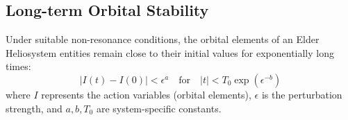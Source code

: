 \subsection{Long-term Orbital Stability}

\begin{theorem}
Under suitable non-resonance conditions, the orbital elements of an Elder Heliosystem entities remain close to their initial values for exponentially long times:
\begin{equation}
|I(t) - I(0)| < \epsilon^a \quad \text{for} \quad |t| < T_0 \exp(\epsilon^{-b})
\end{equation}
where $I$ represents the action variables (orbital elements), $\epsilon$ is the perturbation strength, and $a, b, T_0$ are system-specific constants.
\end{theorem}


